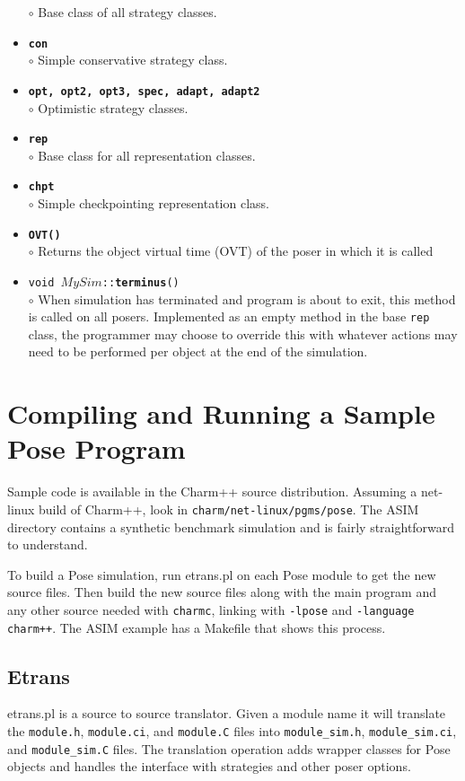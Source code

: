 \documentclass[10pt]{article}
\newcommand{\pose}{{\sc Pose}}
\begin{document}
\begin{itemize}
	$\circ$ Base class of all strategy classes.
\item {\tt {\bf con}}\\
	$\circ$ Simple conservative strategy class.
\item {\tt {\bf opt, opt2, opt3, spec, adapt, adapt2}}\\
	$\circ$ Optimistic strategy classes.
\item {\tt {\bf rep}}\\
	$\circ$ Base class for all representation classes.
\item {\tt {\bf chpt}}\\
	$\circ$ Simple checkpointing representation class.
\item {\tt {\bf OVT()}}\\
	$\circ$ Returns the object virtual time (OVT) of the poser in
	which it is called
\item {\tt void $MySim$::{\bf terminus}()}\\
	$\circ$ When simulation has terminated and program is about to exit, this method is called on all posers.  Implemented as an empty method in the base {\tt rep} class, the programmer may choose to override this with whatever actions may need to be performed per object at the end of the simulation.
\end{itemize}

\section{Compiling and Running a Sample \pose{} Program}

Sample code is available in the Charm++ source distribution.  Assuming a
net-linux build of Charm++, look in {\tt charm/net-linux/pgms/pose}.
The ASIM directory contains a synthetic benchmark simulation and is
fairly straightforward to understand.

To build a \pose{} simulation, run {etrans.pl} on each \pose{} module
to get the new source files.  Then build the new source files along with the
main program and any other source needed with {\tt charmc}, linking
with {\tt -lpose} and {\tt -language charm++}.  The ASIM example has a
Makefile that shows this process.

\subsection{Etrans}

{etrans.pl} is a source to source translator.  Given a module name it will translate the {\tt module.h}, {\tt module.ci}, and {\tt module.C} files into {\tt module\_sim.h}, {\tt module\_sim.ci}, and {\tt module\_sim.C} files.  The translation operation adds wrapper classes for \pose{} objects and handles the interface with strategies and other poser options. 
\end{document}
